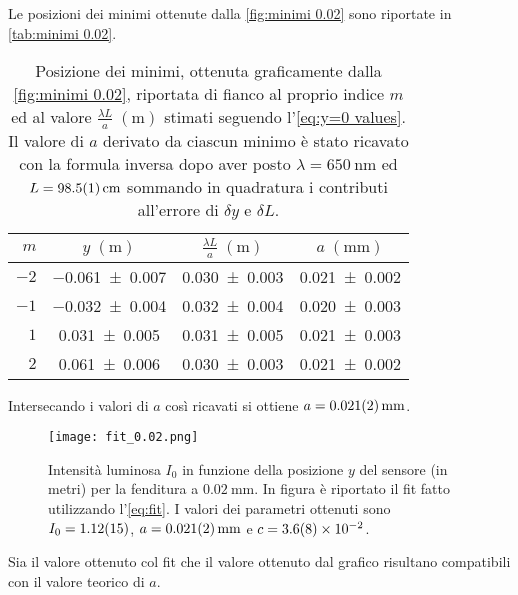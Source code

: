 \documentclass[../main.tex]{subfiles}
\begin{document}
Le posizioni dei minimi ottenute dalla \autoref{fig:minimi 0.02} sono riportate in \autoref{tab:minimi 0.02}.

\begin{table}[ht!]
    \centering
    \caption{Posizione dei minimi, ottenuta graficamente dalla \autoref{fig:minimi 0.02}, riportata di fianco al proprio indice $m$ ed al valore $\frac{\lambda L}{a} \; (\si{\metre})$ stimati seguendo l'\autoref{eq:y=0 values}. Il valore di $a$ derivato da ciascun minimo è stato ricavato con la formula inversa dopo aver posto $\lambda = \qty{650}{\nm}$ ed $L = \qty{98.5+-0.1}{\cm}$ sommando in quadratura i contributi all'errore di $\delta y$ e $\delta L$.}
    \begin{tabular}{r|cc|c}
        \toprule
        $m$  & $y \; (\si{\metre})$ & $\frac{\lambda L}{a} \; (\si{\metre})$ & $a \; (\si{\mm})$ \\
        \midrule
        $-2$ & \num{-0.061+-0.007} & \num{0.030+-0.003} & \num{0.021+-0.002} \\
        $-1$ & \num{-0.032+-0.004} & \num{0.032+-0.004} & \num{0.020+-0.003} \\
        $1$  & \num{0.031+-0.005}  & \num{0.031+-0.005} & \num{0.021+-0.003} \\
        $2$  & \num{0.061+-0.006}  & \num{0.030+-0.003} & \num{0.021+-0.002} \\
        \bottomrule
    \end{tabular}
    \label{tab:minimi 0.02}
\end{table}

Intersecando i valori di $a$ così ricavati si ottiene $a = \qty{0.021+-0.002}{\mm}$.


\begin{figure}[ht!]
    \centering
    \texttt{[image: fit\_0.02.png]}
    \caption{Intensità luminosa $I_{0}$ in funzione della posizione $y$ del sensore (in metri) per la fenditura a $\qty{0.02}{\mm}$. In figura è riportato il fit fatto utilizzando l'\autoref{eq:fit}. I valori dei parametri ottenuti sono $I_{0} = \num{1.12+-0.15}$, $a = \qty{0.021+-0.002}{\mm}$ e $c = \num{3.6+-0.8e-2}$.}
    \label{fig:fit 0.02}
\end{figure}

Sia il valore ottenuto col fit che il valore ottenuto dal grafico risultano compatibili con il valore teorico di $a$.
\end{document}
